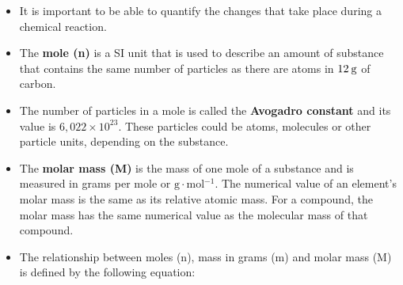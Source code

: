       
      \label{m38712*id285735}\begin{itemize}[noitemsep]
            \label{m38712*uid107}\item It is important to be able to quantify the changes that take place during a chemical reaction.
\label{m38712*uid108}\item The \textbf{mole (n)} is a SI unit that is used to describe an amount of substance that contains the same number of particles as there are atoms in \begin{math}12\phantom{\rule{2pt}{0ex}}\mathrm{g}\end{math} of carbon.
\label{m38712*uid109}\item The number of particles in a mole is called the \textbf{Avogadro constant} and its value is \begin{math}6,022\ensuremath{\times}{10}^{23}\end{math}. These particles could be atoms, molecules or other particle units, depending on the substance.
\label{m38712*uid110}\item The \textbf{molar mass (M)} is the mass of one mole of a substance and is measured in grams per mole or \begin{math}\mathrm{g}\ensuremath{\cdot}\mathrm{mol}{}^{-1}\end{math}. The numerical value of an element's molar mass is the same as its relative atomic mass. For a compound, the molar mass has the same numerical value as the molecular mass of that compound.
\label{m38712*uid111}\item The relationship between moles (n), mass in grams (m) and molar mass (M) is defined by the following equation:
\label{m38712*id285862}\nopagebreak\noindent{}
\end{itemize}
